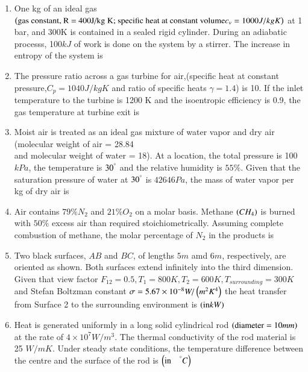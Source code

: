 \documentclass[journal,12pt,onecolumn]{IEEEtran}
\theoremstyle{remark}
\begin{document}
\begin{enumerate}
    \item One kg of an ideal gas $\left(\textnormal{gas constant, R = 400J/kg K; specific
        heat at constant volume} c_v = 1000 J/kg K\right)$ at 1 bar, and 300K is contained in a sealed rigid 
        cylinder. During an adiabatic processs, 100$kJ$ of work is done on the system by a stirrer. 
        The increase in entropy of the system is 
        \hfill{}
   \\     
    \item The pressure ratio across a gas turbine for air,(specific heat at constant pressure,$C_p = 1040J/kg K$ and ratio of specific heats $\gamma = 1.4$) is
        10. If the inlet temperature to the turbine is 1200 K and the isoentropic efficiency is 0.9, the gas 
        temperature at turbine exit is 
        \hfill{}
   \\     
        
    \item Moist air is treated as an ideal gas mixture of water vapor and dry air 
        (molecular weight of air = 28.84\\ and molecular weight of water = 18). At a 
        location, the total pressure is 100$kPa$, the temperature is $30 ^{\degree}$ and the 
        relative humidity is $55\%$. Given that the saturation pressure of water at $30 ^{\degree}$
        is $42646 Pa$, the mass of water vapor per kg of dry air is
        \hfill{}
        

    \item Air contains $79\% N_2$ and $21 \% O_2$ on a molar basis. Methane $\left(CH_4\right)$ is 
        burned with $50\%$ excess air than required stoichiometrically. Assuming complete combustion 
        of methane, the molar percentage of $N_2$ in the products is
        \hfill{}
        
    \item Two black surfaces, $AB$ and $BC$, of lengths $5m$ amd $6m$, respectively, are oriented as shown.
        Both surfaces extend infinitely into the third dimension. Given that view factor 
        $F_{12} = 0.5, T_1 = 800K, T_2 = 600K, T_{surrounding} = 300K$ and Stefan Boltzman constant
        $\sigma = 5.67 \times 10^{-8} W/\left(m^2 K^4\right)$ the heat transfer from Surface 2 to the surrounding
        environment is $\left(\text{in} kW\right)$
        \hfill{}
        \begin{center}
            \resizebox{0.5\textwidth}{!}{
                
            } 
        \end{center} 
    \item Heat is generated uniformly in a long solid cylindrical rod $\left(\text{diameter} = 10mm\right)$
        at the rate of $4 \times 10^7 W/m^3$. The thermal conductivity of the rod material is 25 $W/m K$. Under
        steady state conditions, the temperature difference between the centre and the surface of the rod is
        $\left(\text{in} \quad^{\degree}C\right)$
        \hfill{}


\end{enumerate}
\end{document}

